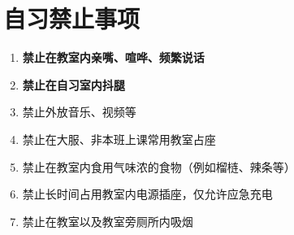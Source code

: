 \section[自习禁止事项]{自习禁止事项}
\begin{enumerate}
    \item \textbf{禁止在教室内亲嘴、喧哗、频繁说话}
    \item \textbf{禁止在自习室内抖腿}
    \item 禁止外放音乐、视频等
    \item 禁止在大服、非本班上课常用教室占座
    \item 禁止在教室内食用气味浓的食物（例如榴梿、辣条等）
    \item 禁止长时间占用教室内电源插座，仅允许应急充电
    \item 禁止在教室以及教室旁厕所内吸烟
\end{enumerate}

